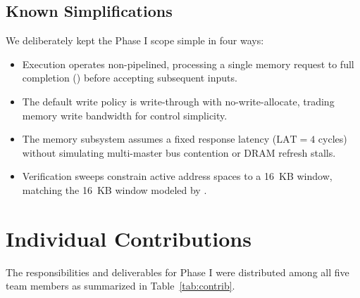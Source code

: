 \documentclass[conference]{IEEEtran}
\newcommand{\sig}[1]{\texttt{\detokenize{#1}}}
\begin{document}
\subsection{Known Simplifications}
We deliberately kept the Phase I scope simple in four ways:
\begin{itemize}
\item Execution operates non-pipelined, processing a single memory request to full completion (\sig{done}) before accepting subsequent inputs.
\item The default write policy is write-through with no-write-allocate, trading memory write bandwidth for control simplicity.
\item The memory subsystem assumes a fixed response latency ($\text{LAT}=4$ cycles) without simulating multi-master bus contention or DRAM refresh stalls.
\item Verification sweeps constrain active address spaces to a 16~KB window, matching the 16~KB window modeled by \sig{main_mem.v}.
\end{itemize}

\section{Individual Contributions}
The responsibilities and deliverables for Phase I were distributed among all five team members as summarized in Table~\ref{tab:contrib}.
\end{document}
